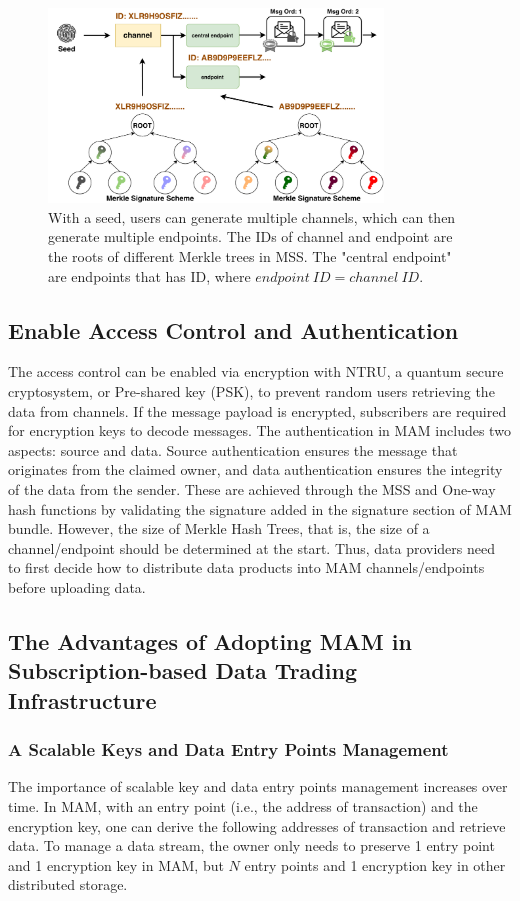 \documentclass[conference]{IEEEtran}
\begin{document}
\begin{figure}[h]
    \centering
    \includegraphics[width=3.5in]{mam_structure}
    \caption{With a seed, users can generate multiple channels, which can then generate multiple endpoints. The IDs of channel and endpoint are the roots of different Merkle trees in MSS. The "central endpoint" are endpoints that has ID, where $endpoint\ ID = channel\ ID$.}
    \label{fig:mam_structure}
\end{figure}

\subsection{Enable Access Control and Authentication}
The access control can be enabled via encryption with NTRU\cite{NTRU}, a quantum secure cryptosystem, or Pre-shared key (PSK), to prevent random users retrieving the data from channels. If the message payload is encrypted, subscribers are required for encryption keys to decode messages. The authentication in MAM includes two aspects: source and data. Source authentication ensures the message that originates from the claimed owner, and data authentication ensures the integrity of the data from the sender. These are achieved through the MSS and One-way hash functions by validating the signature added in the signature section of MAM bundle. However, the size of Merkle Hash Trees, that is, the size of a channel/endpoint should be determined at the start. Thus, data providers need to first decide how to distribute data products into MAM channels/endpoints before uploading data. 

\subsection{The Advantages of Adopting MAM in Subscription-based Data Trading Infrastructure}
\subsubsection{A Scalable Keys and Data Entry Points Management}
The importance of scalable key and data entry points management increases over time. In MAM, with an entry point (i.e., the address of transaction) and the encryption key, one can derive the following addresses of transaction and retrieve data. To manage a data stream, the owner only needs to preserve 1 entry point and 1 encryption key in MAM, but $N$ entry points and 1 encryption key in other distributed storage.
\end{document}
